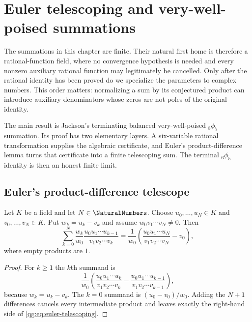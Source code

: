 \chapter{Euler telescoping and very-well-poised summations}
\label{chap:very-well-poised}

The summations in this chapter are finite.  Their natural first home is
therefore a rational-function field, where no convergence hypothesis is
needed and every nonzero auxiliary rational function may legitimately be
cancelled.  Only after the rational identity has been proved do we specialize
the parameters to complex numbers.  This order matters: normalizing a sum by
its conjectured product can introduce auxiliary denominators whose zeros are
not poles of the original identity.

The main result is Jackson's terminating balanced very-well-poised
${}_8\phi_7$ summation.  Its proof has two elementary layers.  A six-variable
rational transformation supplies the algebraic certificate, and Euler's
product-difference lemma turns that certificate into a finite telescoping
sum.  The terminal ${}_6\phi_5$ identity is then an honest finite limit.

\section{Euler's product-difference telescope}
\label{qg:sec:euler-telescope}

\begin{lemma}
\label{qg:lem-euler-telescope}
Let $K$ be a field and let $N\in\NaturalNumbers$.  Choose
$u_0,\ldots,u_N\in K$ and $v_0,\ldots,v_N\in K$.  Put $w_k=u_k-v_k$ and assume
$w_0v_1\cdots v_N\ne0$.  Then
\begin{equation}
\label{qg:eq:euler-telescoping}
 \sum_{k=0}^{N}
 \frac{w_k}{w_0}
 \frac{u_0u_1\cdots u_{k-1}}{v_1v_2\cdots v_k}
 =\frac1{w_0}
 \left(
  \frac{u_0u_1\cdots u_N}{v_1v_2\cdots v_N}-v_0
 \right),
\end{equation}
where empty products are $1$.
\end{lemma}

\begin{proof}
For $k\ge1$ the $k$th summand is
\[
 \frac1{w_0}
 \left(
  \frac{u_0u_1\cdots u_k}{v_1v_2\cdots v_k}
  -\frac{u_0u_1\cdots u_{k-1}}{v_1v_2\cdots v_{k-1}}
 \right),
\]
because $w_k=u_k-v_k$.  The $k=0$ summand is
$(u_0-v_0)/w_0$.  Adding the $N+1$ differences cancels every intermediate
product and leaves exactly the right-hand side of
\eqref{qg:eq:euler-telescoping}.
\end{proof}

